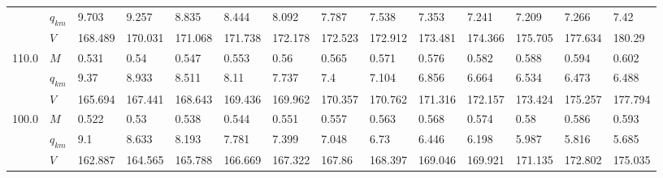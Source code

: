\begin{tabular}{|l|l|llllllllllll|}
      & $q_{km}$ &    9.703 &    9.257 &    8.835 &                     8.444 &                     8.092 &                     7.787 &                     7.538 &                     7.353 &                     7.241 &    7.209\cellcolor{green} &                     7.266 &                      7.42 \\
      & $V$ &  168.489 &  170.031 &  171.068 &                   171.738 &                   172.178 &                   172.523 &                   172.912 &                   173.481 &                   174.366 &  175.705\cellcolor{green} &                   177.634 &                    180.29 \\
\hline
110.0 & $M$ &    0.531 &     0.54 &    0.547 &                     0.553 &                      0.56 &                     0.565 &                     0.571 &                     0.576 &                     0.582 &                     0.588 &    0.594\cellcolor{green} &                     0.602 \\
      & $q_{km}$ &     9.37 &    8.933 &    8.511 &                      8.11 &                     7.737 &                       7.4 &                     7.104 &                     6.856 &                     6.664 &                     6.534 &    6.473\cellcolor{green} &                     6.488 \\
      & $V$ &  165.694 &  167.441 &  168.643 &                   169.436 &                   169.962 &                   170.357 &                   170.762 &                   171.316 &                   172.157 &                   173.424 &  175.257\cellcolor{green} &                   177.794 \\
\hline
100.0 & $M$ &    0.522 &     0.53 &    0.538 &                     0.544 &                     0.551 &                     0.557 &                     0.563 &                     0.568 &                     0.574 &                      0.58 &                     0.586 &    0.593\cellcolor{green} \\
      & $q_{km}$ &      9.1 &    8.633 &    8.193 &                     7.781 &                     7.399 &                     7.048 &                      6.73 &                     6.446 &                     6.198 &                     5.987 &                     5.816 &    5.685\cellcolor{green} \\
      & $V$ &  162.887 &  164.565 &  165.788 &                   166.669 &                   167.322 &                    167.86 &                   168.397 &                   169.046 &                   169.921 &                   171.135 &                   172.802 &  175.035\cellcolor{green} \\
\hline
\end{tabular}